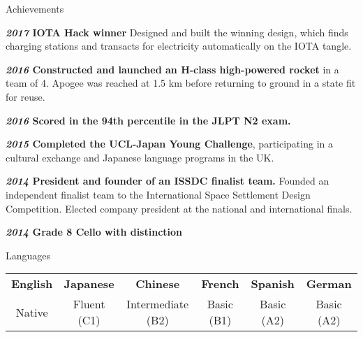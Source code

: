 \documentclass[10pt]{resume} %
\begin{document}

\begin{rSection}{Achievements}
    \item \textbf{\textit{2017} IOTA Hack winner}
    Designed and built the winning design, which finds charging stations and
    transacts for electricity automatically on the IOTA tangle.
    \item \textbf{\textit{2016} Constructed and launched an H-class high-powered rocket}
    in a team of 4. Apogee was reached at 1.5 km before returning to ground in
    a state fit for reuse.
    \item \textbf{\textit{2016} Scored in the 94th percentile in the JLPT N2 exam.}
    \item \textbf{\textit{2015} Completed the UCL-Japan Young Challenge},
    participating in a cultural exchange and Japanese language programs in the
    UK.
    \item \textbf{\textit{2014} President and founder of an ISSDC finalist team.}
    Founded an independent finalist team to the International Space Settlement
    Design Competition. Elected company president at the national and
    international finals.
    \item \textbf{\textit{2014} Grade 8 Cello with distinction}
\end{rSection}


\begin{rSection}{Languages}

\begin{center}
\begin{tabular}{ c c c c c c }
 \textbf{English} & \textbf{Japanese} & \textbf{Chinese} & \textbf{French} &
 \textbf{Spanish} & \textbf{German} \\
 Native & Fluent (C1) & Intermediate (B2) & Basic (B1) & Basic (A2) & Basic (A2)
\end{tabular}
\end{center}

\end{rSection}

\end{document}

